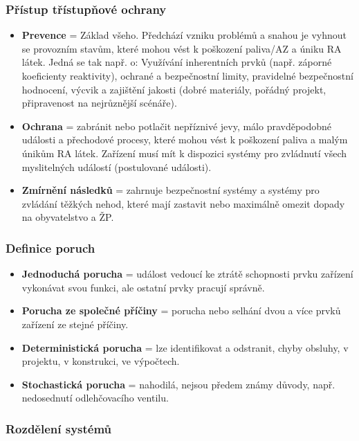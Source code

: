 \subsubsection{Přístup třístupňové ochrany}

\begin{itemize}
    \item \textbf{Prevence} = Základ všeho. Předchází vzniku problémů a snahou je vyhnout se provozním stavům, které mohou vést k poškození paliva/AZ a úniku RA látek. Jedná se tak např. o: Využívání inherentních prvků (např. záporné koeficienty reaktivity), ochrané a bezpečnostní limity, pravidelné bezpečnostní hodnocení, výcvik a zajištění jakosti (dobré materiály, pořádný projekt, připravenost na nejrůznější scénáře).
    \item \textbf{Ochrana} = zabránit nebo potlačit nepříznivé jevy, málo pravděpodobné události a přechodové procesy, které mohou vést k poškození paliva a malým únikům RA látek. Zařízení musí mít k dispozici systémy pro zvládnutí všech myslitelných událostí (postulované události).
    \item \textbf{Zmírnění následků} = zahrnuje bezpečnostní systémy a systémy pro zvládání těžkých nehod, které mají zastavit nebo maximálně omezit dopady na obyvatelstvo a ŽP.
\end{itemize}

\subsubsection{Definice poruch}

\begin{itemize}
    \item \textbf{Jednoduchá porucha} = událost vedoucí ke ztrátě schopnosti prvku zařízení vykonávat svou funkci, ale ostatní prvky pracují správně.
    \item \textbf{Porucha ze společné příčiny} = porucha nebo selhání dvou a více prvků zařízení ze stejné příčiny.
    \item \textbf{Deterministická porucha} = lze identifikovat a odstranit, chyby obsluhy, v projektu, v konstrukci, ve výpočtech.
    \item \textbf{Stochastická porucha} = nahodilá, nejsou předem známy důvody, např. nedosednutí odlehčovacího ventilu.
\end{itemize}

\subsubsection{Rozdělení systémů}

